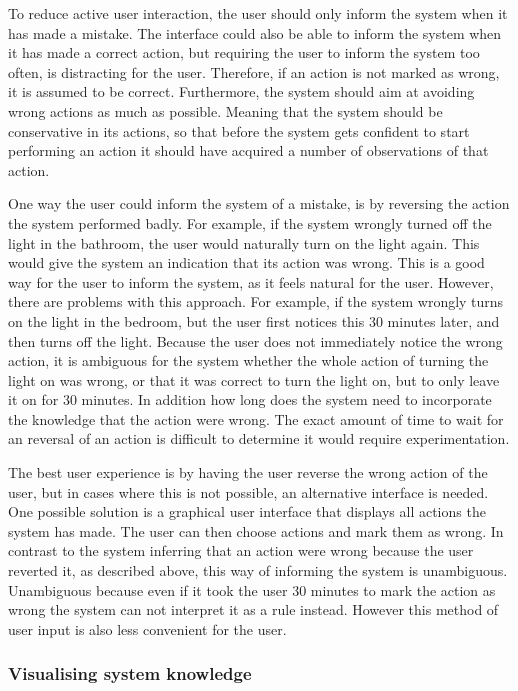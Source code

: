 To reduce active user interaction, the user should only inform the system when it has made a mistake. The interface could also be able to inform the system when it has made a correct action, but requiring the user to inform the system too often, is distracting for the user. Therefore, if an action is not marked as wrong, it is assumed to be correct. Furthermore, the system should aim at avoiding wrong actions as much as possible. Meaning that the system should be conservative in its actions, so that before the system gets confident to start performing an action it should have acquired a number of observations of that action.

One way the user could inform the system of a mistake, is by reversing the action the system performed badly. For example, if the system wrongly turned off the light in the bathroom, the user would naturally turn on the light again. This would give the system an indication that its action was wrong. This is a good way for the user to inform the system, as it feels natural for the user. However, there are problems with this approach. For example, if the system wrongly turns on the light in the bedroom, but the user first notices this 30 minutes later, and then turns off the light. Because the user does not immediately notice the wrong action, it is ambiguous for the system whether the whole action of turning the light on was wrong, or that it was correct to turn the light on, but to only leave it on for 30 minutes. In addition how long does the system need to incorporate the knowledge that the action were wrong. The exact amount of time to wait for an reversal of an action is difficult to determine it would require experimentation. 

The best user experience is by having the user reverse the wrong action of the user, but in cases where this is not possible, an alternative interface is needed. One possible solution is a graphical user interface that displays all actions the system has made. The user can then choose actions and mark them as wrong. In contrast to the system inferring that an action were wrong because the user reverted it, as described above, this way of informing the system is unambiguous. Unambiguous because even if it took the user 30 minutes to mark the action as wrong the system can not interpret it as a rule instead. However this method of user input is also less convenient for the user.

\subsubsection{Visualising system knowledge}

